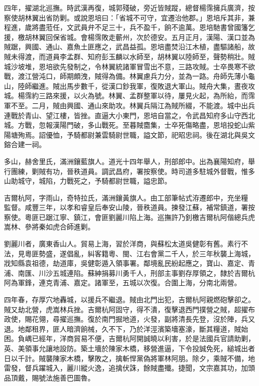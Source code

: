 \begin{pinyinscope}
四年，擢湖北巡撫。時武漢再復，城郭殘破，旁近皆賊蹤，總督楊霈擁兵廣濟，按察使胡林翼出省防剿。或說恩培曰：「省城不可守，宜遷治他郡。」恩培斥其非，兼程進，歲將盡蒞任，文武員弁不足三十，兵不盈千，餉不逾萬。恩培馳書曾國籓乞援，檄胡林翼回保省城。會楊霈敗走蘄州，次於德安。五月正月，漢陽、漢口並為賊踞，興國、通山、嘉魚土匪應之，武昌益孤。恩培盡焚沿江木植，盡驅諸船，故賊未得渡，而道員李孟群、知府彭玉麟以水師至，胡林翼以陸師至，聲勢稍壯。賊城沙坡堆，恩培欲先發制之，令林翼統諸軍冒雪出不意，三路攻賊。士卒畏寒不欲戰，渡江營沌口，師期頗洩，賊得為備。林翼慮兵力分，並為一路。舟師先薄小龜山，陸師繼進。賊出馬步數千，從漢口鈔我軍，復敗退大軍山。賊舟大集，晝夜攻城。楊霈約三路來援，以火為號。林翼、孟群整軍以待，屢見火起，為所紿，而霈軍不至。二月，賊由興國、通山來助攻。林翼兵隔江為賊所綴，不能渡。城中出兵連戰於青山、望江樓，皆挫。直逼大小東門，恩培自當之，令武昌知府多山守西北城。方戰，忽報漢陽門破，多山戰死。至暮賊麕集，士卒死傷略盡，恩培投蛇山紫陽塘殉焉。詔優恤，予騎都尉兼雲騎尉世職，謚文節，祀昭忠祠。後在湖北與吳文鎔合建一祠。

多山，赫舍里氏，滿洲鑲藍旗人。道光十四年舉人，刑部郎中。出為襄陽知府，舉行團練，剿賊有功，晉秩道員。調武昌府，署按察使。時司道多駐城外督戰，惟多山助城守，城陷，力戰死之，予騎都尉世職，謚忠節。

吉爾杭阿，字雨山，奇特拉氏，滿洲鑲黃旗人。由工部筆帖式洊遷郎中，充坐糧監督。咸豐三年，以孝和睿皇后奉安山陵，晉秩道員。揀發江蘇，補常鎮道，署按察使。粵匪已踞江寧、鎮江，會匪劉麗川陷上海。巡撫許乃釗檄吉爾杭阿偕總兵虎嵩林、參將秦如虎合師進剿。

劉麗川者，廣東香山人。貿易上海，習於洋商，與蘇松太道吳健彰有舊。素行不法，見粵匪勢盛，遂倡亂，糾客籍粵、閩、江右會黨二千人，於三年秋襲上海城，戕知縣袁祖德，劫道庫，吳健彰遁入領事署。鄰境亂民紛起應之，寶山、嘉定、青浦、南匯、川沙五城連陷。蘇紳捐募川勇千人，刑部主事劉存厚領之，隸於吉爾杭阿為軍鋒，連克青浦、嘉定。諸軍至，五城以次復。合圍上海，分南北兩營。

四年春，存厚穴地轟城，以援兵不繼退。賊由北門出犯，吉爾杭阿親燃砲擊卻之。賊又劫北營，虎嵩林兵挫。吉爾杭阿固守，得不潰，復擊退西門撲營之賊，超擢布政使，賜花翎，尋擢巡撫。復於南門掘地道，火發，副將清長先登，沒於陣，兵又退。地鄰租界，匪人暗濟餉械，久不下，乃於洋涇濱築墻塞濠，斷其糧道，賊始困。負嵎已經年，洋商貿易不便，吉爾杭阿開誠曉以利害，於是法國兵官請助剿，英、美領事允讓地設防。築土墻於陳家木橋，移營進逼，下令投誠免死，縋城出者日以千計。賊襲陳家木橋，擊敗之，擒斬悍黨偽將軍林阿朋。除夕，乘賊不備，地雷發，督兵躍城入，麗川縱火逸，追擒伏誅，餘賊盡殲。捷聞，文宗嘉其功，加頭品頂戴，賜號法施善巴圖魯。


\end{pinyinscope}
